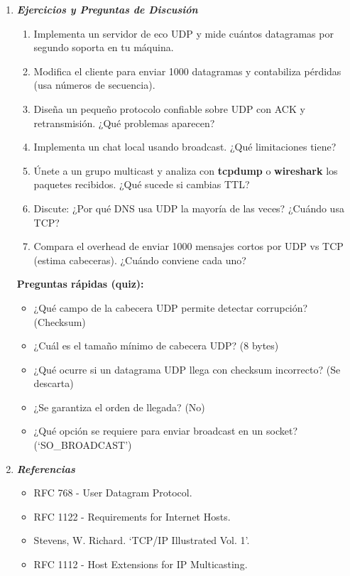 \documentclass[12pt]{amsart}
\begin{document}
\begin{enumerate}
		\bigskip \bigskip

		\item \textbf{\textit{Ejercicios y Preguntas de Discusión}}
		\medskip
		\begin{enumerate}
		\item Implementa un servidor de eco UDP y mide cuántos datagramas por segundo soporta en tu máquina.
		\item Modifica el cliente para enviar 1000 datagramas y contabiliza pérdidas (usa números de secuencia).
		\item Diseña un pequeño protocolo confiable sobre UDP con ACK y retransmisión. ¿Qué problemas aparecen?
		\item Implementa un chat local usando broadcast. ¿Qué limitaciones tiene?
		\item Únete a un grupo multicast y analiza con \textbf{tcpdump} o \textbf{wireshark} los paquetes recibidos. ¿Qué sucede si cambias TTL?
		\item Discute: ¿Por qué DNS usa UDP la mayoría de las veces? ¿Cuándo usa TCP?
		\item Compara el overhead de enviar 1000 mensajes cortos por UDP vs TCP (estima cabeceras). ¿Cuándo conviene cada uno?
		\end{enumerate}
		
		\medskip \medskip

		\noindent \textbf{Preguntas rápidas (quiz):}
		\medskip \medskip
		\begin{itemize}
		\item ¿Qué campo de la cabecera UDP permite detectar corrupción? (Checksum)
		\item ¿Cuál es el tamaño mínimo de cabecera UDP? (8 bytes)
		\item ¿Qué ocurre si un datagrama UDP llega con checksum incorrecto? (Se descarta)
		\item ¿Se garantiza el orden de llegada? (No)
		\item ¿Qué opción se requiere para enviar broadcast en un socket? (`SO\_BROADCAST')
		\end{itemize}

		\bigskip \bigskip

		\item \textbf{\textit{Referencias}}
		\medskip
		\begin{itemize}
		\item RFC 768 - User Datagram Protocol.
		\item RFC 1122 - Requirements for Internet Hosts.
		\item Stevens, W. Richard. `TCP/IP Illustrated Vol. 1'.
		\item RFC 1112 - Host Extensions for IP Multicasting.
		\end{itemize}

		\bigskip \bigskip

	\end{enumerate}	
\end{document}
